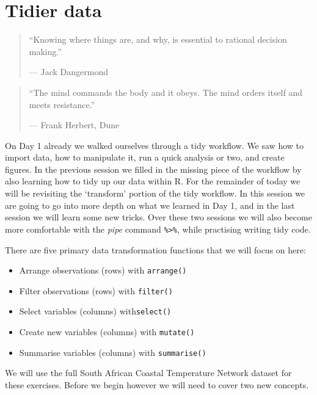 \documentclass[
]{book}
\providecommand{\tightlist}{%
  \setlength{\itemsep}{0pt}\setlength{\parskip}{0pt}}
\begin{document}
\hypertarget{tidier}{%
\chapter{Tidier data}\label{tidier}}

\begin{quote}
``Knowing where things are, and why, is essential to rational decision making.''

--- Jack Dangermond
\end{quote}

\begin{quote}
``The mind commands the body and it obeys. The mind orders itself and meets resistance.''

--- Frank Herbert, Dune
\end{quote}

On Day 1 already we walked ourselves through a tidy workflow. We saw how to import data, how to manipulate it, run a quick analysis or two, and create figures. In the previous session we filled in the missing piece of the workflow by also learning how to tidy up our data within R. For the remainder of today we will be revisiting the `transform' portion of the tidy workflow. In this session we are going to go into more depth on what we learned in Day 1, and in the last session we will learn some new tricks. Over these two sessions we will also become more comfortable with the \emph{pipe} command \texttt{\%\textgreater{}\%}, while practising writing tidy code.

There are five primary data transformation functions that we will focus on here:

\begin{itemize}
\tightlist
\item
  Arrange observations (rows) with \texttt{arrange()}\\
\item
  Filter observations (rows) with \texttt{filter()}\\
\item
  Select variables (columns) with\texttt{select()}\\
\item
  Create new variables (columns) with \texttt{mutate()}\\
\item
  Summarise variables (columns) with \texttt{summarise()}
\end{itemize}

We will use the full South African Coastal Temperature Network dataset for these exercises. Before we begin however we will need to cover two new concepts.
\end{document}

